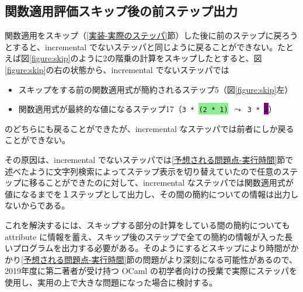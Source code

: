 \subsection{関数適用評価スキップ後の前ステップ出力}

関数適用をスキップ（\ref{実装-実際のステッパ}節）した後に前のステップに戻ろうとすると、incremental でないステッパ\cite{FCA19}と同じように戻ることができない。たとえば図\ref{figure:skip}のように2の階乗の計算をスキップしたとすると、図\ref{figure:skip}の右の状態から、incremental でないステッパでは
\begin{itemize}
\item スキップをする前の関数適用式が簡約されるステップ5（図\ref{figure:skip}左）
\item 関数適用式が最終的な値になるステップ17（\texttt{3 * \colorbox{lightgreen}{(2 * 1)} $\leadsto$ 3 * \colorbox{purple}{2}}）
\end{itemize}
のどちらにも戻ることができたが、incremental なステッパでは前者にしか戻ることができない。

その原因は、incremental でないステッパ\cite{FCA19}では\ref{予想される問題点-実行時間}節で述べたように文字列検索によってステップ表示を切り替えていたので任意のステップに移ることができたのに対して、incremental なステッパでは関数適用式が値になるまでを１ステップとして出力し、その間の簡約についての情報は出力しないからである。

これを解決するには、スキップする部分の計算をしている間の簡約についても attribute に情報を蓄え、スキップ後のステップで全ての簡約の情報が入った長いプログラムを出力する必要がある。そのようにするとスキップにより時間がかかり\ref{予想される問題点-実行時間}節の問題がより深刻になる可能性があるので、2019年度に第二著者が受け持つ OCaml の初学者向けの授業で実際にステッパを使用し、実用の上で大きな問題になった場合に検討する。
